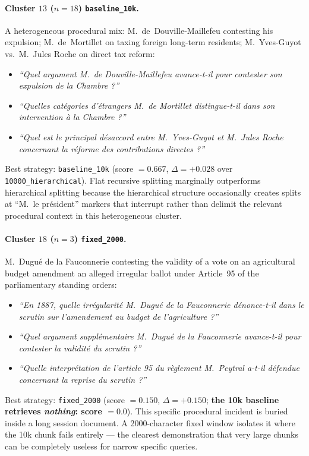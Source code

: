 \paragraph{Cluster $13$ ($n=18$) \texttt{baseline\_10k}.}
A heterogeneous procedural mix: M.~de~Douville-Maillefeu contesting his
expulsion; M.~de~Mortillet on taxing foreign long-term residents;
M.~Yves-Guyot vs.\ M.~Jules Roche on direct tax reform:
\begin{itemize}
  \item \textit{``Quel argument M.~de Douville-Maillefeu avance-t-il pour
    contester son expulsion de la Chambre ?''}
  \item \textit{``Quelles cat\'{e}gories d'\'{e}trangers M.~de Mortillet
    distingue-t-il dans son intervention \`{a} la Chambre ?''}
  \item \textit{``Quel est le principal d\'{e}saccord entre M.~Yves-Guyot et
    M.~Jules Roche concernant la r\'{e}forme des contributions directes ?''}
\end{itemize}
Best strategy: \texttt{baseline\_10k} (score $= 0.667$, $\Delta = +0.028$ over
\texttt{10000\_hierarchical}).
Flat recursive splitting marginally outperforms hierarchical splitting because the
hierarchical structure occasionally creates splits at ``M.~le pr\'{e}sident''
markers that interrupt rather than delimit the relevant procedural context in this
heterogeneous cluster.

\paragraph{Cluster $18$ ($n=3$) \texttt{fixed\_2000}.}
M.~Dugu\'{e} de la Fauconnerie contesting the validity of a vote on an
agricultural budget amendment an alleged irregular ballot under Article~95 of
the parliamentary standing orders:
\begin{itemize}
  \item \textit{``En 1887, quelle irr\'{e}gularit\'{e} M.~Dugu\'{e} de la
    Fauconnerie d\'{e}nonce-t-il dans le scrutin sur l'amendement au budget de
    l'agriculture ?''}
  \item \textit{``Quel argument suppl\'{e}mentaire M.~Dugu\'{e} de la Fauconnerie
    avance-t-il pour contester la validit\'{e} du scrutin ?''}
  \item \textit{``Quelle interpr\'{e}tation de l'article 95 du r\`{e}glement
    M.~Peytral a-t-il d\'{e}fendue concernant la reprise du scrutin ?''}
\end{itemize}
Best strategy: \texttt{fixed\_2000} (score $= 0.150$, $\Delta = +0.150$;
\textbf{the 10k baseline retrieves \emph{nothing}: score $= 0.0$}).
This specific procedural incident is buried inside a long session document.
A 2000-character fixed window isolates it where the 10k chunk fails entirely ---
the clearest demonstration that very large chunks can be completely useless for
narrow specific queries.

